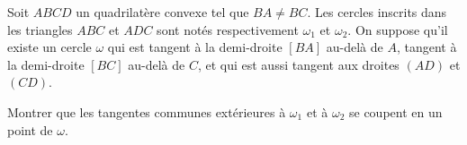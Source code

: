 Soit $ABCD$ un quadrilatère convexe tel que $BA \neq BC$. Les cercles inscrits dans les triangles $ABC$ et
$ADC$ sont notés respectivement $\omega_1$ et $\omega_2$. On suppose qu'il existe un cercle $\omega$ qui est
tangent à la demi-droite $[BA]$ au-delà de $A$, tangent à la demi-droite $[BC]$ au-delà de $C$, et qui est
aussi tangent aux droites $(AD)$ et $(CD)$.

Montrer que les tangentes communes extérieures à $\omega_1$ et à $\omega_2$ se coupent en un point de $\omega$.
